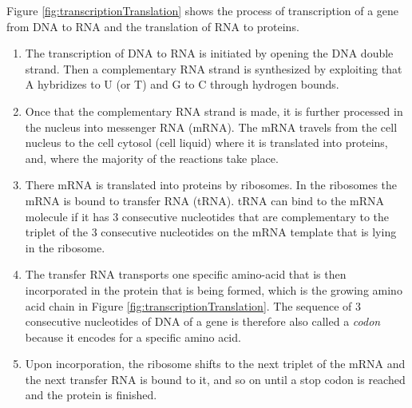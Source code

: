 \documentclass[
  11pt,
]{book}
\begin{document}
Figure \ref{fig:transcriptionTranslation} shows the process of transcription of a gene from DNA to RNA and the translation of RNA to proteins.

\begin{enumerate}
\def\labelenumi{\arabic{enumi}.}
\item
  The transcription of DNA to RNA is initiated by opening the
  DNA double strand. Then a complementary RNA strand is synthesized by exploiting that A hybridizes to U (or T) and G to C through hydrogen bounds.
\item
  Once that the complementary RNA strand is made, it is further processed in the nucleus into messenger RNA (mRNA). The mRNA travels from the cell nucleus to the cell cytosol (cell liquid) where it is translated into proteins, and, where the majority of the reactions take place.
\item
  There mRNA is translated into proteins by ribosomes.
  In the ribosomes the mRNA is bound to transfer RNA (tRNA). tRNA can bind to the mRNA molecule if it has 3 consecutive nucleotides that are complementary to the triplet of the 3 consecutive nucleotides on the mRNA template that is lying in the ribosome.
\item
  The transfer RNA transports one specific amino-acid that is then incorporated in the protein that is being formed, which is the growing amino acid chain in Figure \ref{fig:transcriptionTranslation}. The sequence of 3 consecutive nucleotides of DNA of a gene is therefore also called a \emph{codon} because it encodes for a specific amino acid.
\item
  Upon incorporation, the ribosome shifts to the next triplet of the mRNA and the next transfer RNA is bound to it, and so on until a stop codon is reached and the protein is finished.
\end{enumerate}
\end{document}
